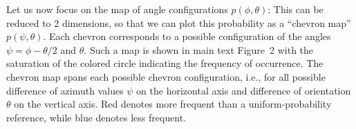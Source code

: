 \documentclass[a4paper]{article}
\begin{document}
Let us now focus on the map of angle configurations 
$p(\phi, \theta)$: %
This can be reduced to 2 dimensions, 
so that we can plot this probability as a ``chevron map'' $p(\psi, \theta)$.
Each chevron corresponds to a possible configuration of 
the angles $\psi = \phi - \theta/2$ and $\theta$. 
Such a map is shown in main text Figure~2 %
with the saturation of the colored circle indicating the frequency of occurrence.
The chevron map spans each possible chevron configuration, 
i.e., for all possible difference of azimuth values $\psi$ on the horizontal axis 
and difference of orientation $\theta$ on the vertical axis. 
Red denotes more frequent than a uniform-probability reference, while
blue denotes less frequent. 

\end{document}
